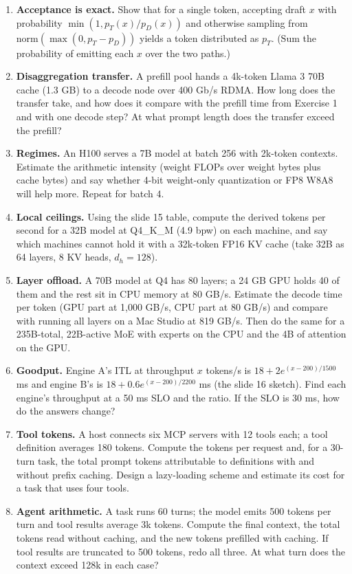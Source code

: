 \documentclass[11pt,letterpaper]{article}
\begin{document}
\begin{enumerate}[leftmargin=1.6em,itemsep=6pt]
\item \textbf{Acceptance is exact.} Show that for a single token, accepting draft $x$ with probability $\min(1,p_T(x)/p_D(x))$ and otherwise sampling from $\mathrm{norm}(\max(0,p_T-p_D))$ yields a token distributed as $p_T$. (Sum the probability of emitting each $x$ over the two paths.)
\item \textbf{Disaggregation transfer.} A prefill pool hands a 4k-token Llama 3 70B cache (1.3 GB) to a decode node over 400 Gb/s RDMA. How long does the transfer take, and how does it compare with the prefill time from Exercise 1 and with one decode step? At what prompt length does the transfer exceed the prefill?
\item \textbf{Regimes.} An H100 serves a 7B model at batch 256 with 2k-token contexts. Estimate the arithmetic intensity (weight FLOPs over weight bytes plus cache bytes) and say whether 4-bit weight-only quantization or FP8 W8A8 will help more. Repeat for batch 4.
\item \textbf{Local ceilings.} Using the slide 15 table, compute the derived tokens per second for a 32B model at Q4\_K\_M (4.9 bpw) on each machine, and say which machines cannot hold it with a 32k-token FP16 KV cache (take 32B as 64 layers, 8 KV heads, $d_h=128$).
\item \textbf{Layer offload.} A 70B model at Q4 has 80 layers; a 24 GB GPU holds 40 of them and the rest sit in CPU memory at 80 GB/s. Estimate the decode time per token (GPU part at 1,000 GB/s, CPU part at 80 GB/s) and compare with running all layers on a Mac Studio at 819 GB/s. Then do the same for a 235B-total, 22B-active MoE with experts on the CPU and the 4B of attention on the GPU.
\item \textbf{Goodput.} Engine A's ITL at throughput $x$ tokens/s is $18+2e^{(x-200)/1500}$ ms and engine B's is $18+0.6e^{(x-200)/2200}$ ms (the slide 16 sketch). Find each engine's throughput at a 50 ms SLO and the ratio. If the SLO is 30 ms, how do the answers change?
\item \textbf{Tool tokens.} A host connects six MCP servers with 12 tools each; a tool definition averages 180 tokens. Compute the tokens per request and, for a 30-turn task, the total prompt tokens attributable to definitions with and without prefix caching. Design a lazy-loading scheme and estimate its cost for a task that uses four tools.
\item \textbf{Agent arithmetic.} A task runs 60 turns; the model emits 500 tokens per turn and tool results average 3k tokens. Compute the final context, the total tokens read without caching, and the new tokens prefilled with caching. If tool results are truncated to 500 tokens, redo all three. At what turn does the context exceed 128k in each case?

\end{enumerate}
\end{document}
